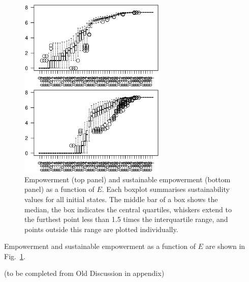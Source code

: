 \documentclass[conference]{IEEEtran}
\begin{document}
\begin{figure}
  \begin{center}

    \includegraphics[width=7cm]{n08_full_small_emp.eps}

    \includegraphics[width=7cm]{n08_full_small_empsust.eps}

  \end{center}

  \caption{Empowerment (top panel) and sustainable empowerment
    (bottom panel) as a function of $E$. Each boxplot summarises
    sustainability values for all initial states. The middle bar of
    a box shows the median, the box indicates the central quartiles,
    whiskers extend to the furthest point less than 1.5 times the
    interquartile range, and points outside this range are plotted
    individually.}
  \label{fig_empowermentprofiles}
\end{figure}

Empowerment and sustainable empowerment as a function of $E$ are shown
in Fig.~\ref{fig_empowermentprofiles}.

(to be completed from Old Discussion in appendix)
\end{document}
